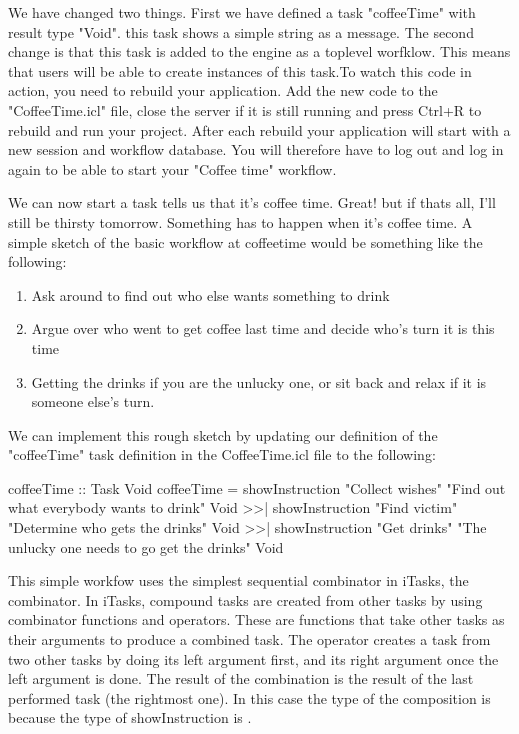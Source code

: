 \documentclass[a4paper,11pt]{article}
\begin{document}
We have changed two things. First we have defined a task "coffeeTime" with result type "Void". this task shows a simple string as a message. The second change is that this task is added to the engine as a toplevel worfklow. This means that users will be able to create instances of this task.To watch this code in action, you need to rebuild your application. Add the new code to the "CoffeeTime.icl" file, close the server if it is still running and press Ctrl+R to rebuild and run your project. After each rebuild your application will start with a new session and workflow database. You will therefore have to log out and log in again to be able to start your "Coffee time" workflow.

We can now start a task tells us that it's coffee time. Great! but if thats all, I'll still be thirsty tomorrow. Something has to happen when it's coffee time. A simple sketch of the  basic workflow at coffeetime would be something like the following:
\begin{enumerate}
\item Ask around to find out who else wants something to drink
\item Argue over who went to get coffee last time and decide who's turn it is this time
\item Getting the drinks if you are the unlucky one, or sit back and relax if it is someone else's turn.
\end{enumerate}
We can implement this rough sketch by updating our definition of the "coffeeTime" task definition in the CoffeeTime.icl file to the following:
\begin{CleanCode}
coffeeTime :: Task Void
coffeeTime
  =   showInstruction 
  		"Collect wishes" "Find out what everybody wants to drink" Void
  >>| showInstruction 
  		"Find victim" "Determine who gets the drinks" Void
  >>| showInstruction 
  		"Get drinks" "The unlucky one needs to go get the drinks" Void
\end{CleanCode}
This simple workfow uses the simplest sequential combinator in iTasks, the \CleanInline{>>|} combinator.  In iTasks, compound tasks are created from other tasks by using combinator functions and operators. These are functions that take other tasks as their arguments to produce a combined task. The \CleanInline{>>|} operator creates a task from two other tasks by doing its left argument first, and its right argument once the left argument is done. The result of the combination is the result of the last performed task (the rightmost one). In this case the type of the composition is  because the type of showInstruction is .
\end{document}
